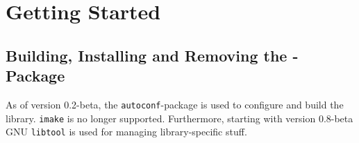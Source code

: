 
\newpage
\section{Getting Started}
\subsection{Building, Installing and Removing the \tonelib-Package}
\label{compiling}%
As of version 0.2-beta, the \verb+autoconf+-package is used to configure and
build the library. \verb+imake+ is no longer supported. Furthermore, starting
with version 0.8-beta GNU \verb+libtool+ is used for managing library-specific
stuff. 

